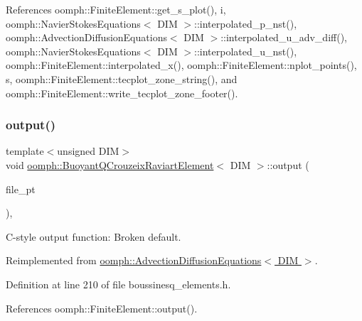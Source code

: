References oomph\+::\+Finite\+Element\+::get\+\_\+s\+\_\+plot(), i, oomph\+::\+Navier\+Stokes\+Equations$<$ D\+I\+M $>$\+::interpolated\+\_\+p\+\_\+nst(), oomph\+::\+Advection\+Diffusion\+Equations$<$ D\+I\+M $>$\+::interpolated\+\_\+u\+\_\+adv\+\_\+diff(), oomph\+::\+Navier\+Stokes\+Equations$<$ D\+I\+M $>$\+::interpolated\+\_\+u\+\_\+nst(), oomph\+::\+Finite\+Element\+::interpolated\+\_\+x(), oomph\+::\+Finite\+Element\+::nplot\+\_\+points(), s, oomph\+::\+Finite\+Element\+::tecplot\+\_\+zone\+\_\+string(), and oomph\+::\+Finite\+Element\+::write\+\_\+tecplot\+\_\+zone\+\_\+footer().

\mbox{\label{classoomph_1_1BuoyantQCrouzeixRaviartElement_a9ba77409f12b80862262f6695829055b}} 
\subsubsection{\texorpdfstring{output()}{output()}\hspace{0.1cm}{\footnotesize\ttfamily [3/4]}}
{\footnotesize\ttfamily template$<$unsigned D\+IM$>$ \\
void \hyperlink{classoomph_1_1BuoyantQCrouzeixRaviartElement}{oomph\+::\+Buoyant\+Q\+Crouzeix\+Raviart\+Element}$<$ D\+IM $>$\+::output (\begin{DoxyParamCaption}\item[{F\+I\+LE $\ast$}]{file\+\_\+pt }\end{DoxyParamCaption})\hspace{0.3cm}{\ttfamily [inline]}, {\ttfamily [virtual]}}



C-\/style output function\+: Broken default. 



Reimplemented from \hyperlink{classoomph_1_1AdvectionDiffusionEquations_a063f08a2825608d32eaac5666c2ccec5}{oomph\+::\+Advection\+Diffusion\+Equations$<$ D\+I\+M $>$}.



Definition at line 210 of file boussinesq\+\_\+elements.\+h.



References oomph\+::\+Finite\+Element\+::output().

